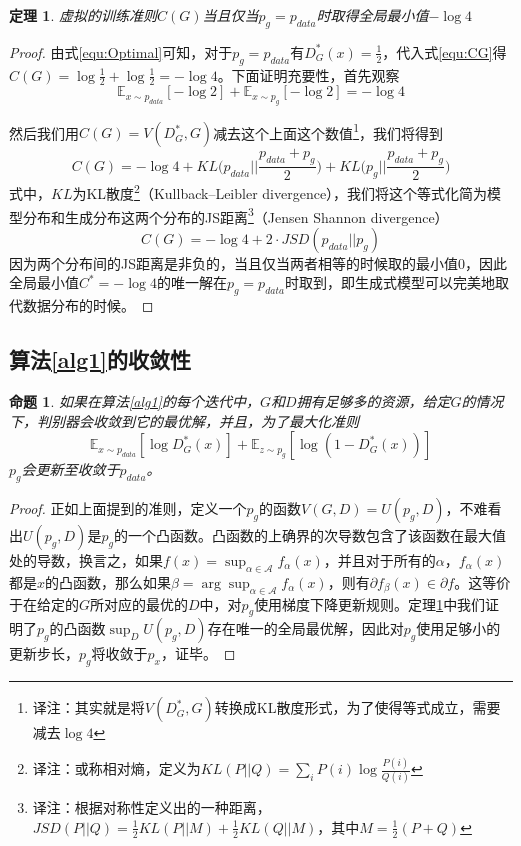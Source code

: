 \documentclass[UTF8]{ctexart}
\newtheorem{proposition}{命题}[section]
\newtheorem{proof}{证明}[section]
\newtheorem{theorem}{定理}[section]
\begin{document}
\begin{theorem}\label{the:1}
虚拟的训练准则$C(G)$当且仅当$p_g = p_{data}$时取得全局最小值$-\log 4$
\end{theorem}
\begin{proof}
由式\eqref{equ:Optimal}可知，对于$p_g = p_{data}$有$D_G^*(x) = \frac{1}{2}$，代入式\eqref{equ:CG}得$C(G) = \log \frac{1}{2} + \log	\frac{1}{2} = -\log 4$。下面证明充要性，首先观察
\begin{equation*}
\mathbb{E}_{x\sim p_{data}}[-\log 2] + \mathbb{E}_{x\sim p_g}[-\log 2] = -\log 4
\end{equation*}

然后我们用$C(G)=V(D^*_G, G)$减去这个上面这个数值\footnote{译注：其实就是将$V(D^*_G, G)$转换成KL散度形式，为了使得等式成立，需要减去$\log 4$}，我们将得到
\begin{equation}
C(G) = -\log 4 + KL\Big(p_{data} \Big|\Big| \frac{p_{data} + p_g}{2} \Big) + KL\Big(p_g \Big|\Big| \frac{p_{data} + p_g}{2}\Big)
\end{equation}
式中，$KL$为KL散度\footnote{译注：或称相对熵，定义为$KL(P||Q) = \sum\limits_i P(i)\log\frac{P(i)}{Q(i)}$}（Kullback–Leibler divergence），我们将这个等式化简为模型分布和生成分布这两个分布的JS距离\footnote{译注：根据对称性定义出的一种距离，$JSD(P || Q) = \frac{1}{2}KL(P || M) + \frac{1}{2}KL(Q || M)$，其中$M = \frac{1}{2}(P+Q)$}（Jensen Shannon divergence）
\begin{equation}
C(G) = -\log 4 + 2 \cdot JSD(p_{data} || p_g)
\end{equation}
因为两个分布间的JS距离是非负的，当且仅当两者相等的时候取的最小值0，因此全局最小值$C^*=-\log 4$的唯一解在$p_g = p_{data}$时取到，即生成式模型可以完美地取代数据分布的时候。
\end{proof}

\subsection{算法\ref{alg1}的收敛性\label{sec:4.2}}

\begin{proposition}
如果在算法\ref{alg1}的每个迭代中，$G$和$D$拥有足够多的资源，给定$G$的情况下，判别器会收敛到它的最优解，并且，为了最大化准则
\begin{equation*}
\mathbb{E}_{x\sim p_{data}}[\log D_G^*(x)] + \mathbb{E}_{z\sim p_g}[\log(1 - D_G^*(x))]
\end{equation*}
$p_g$会更新至收敛于$p_{data}$。
\end{proposition}
\begin{proof}
正如上面提到的准则，定义一个$p_g$的函数$V(G, D) = U(p_g, D)$，不难看出$U(p_g, D)$是$p_g$的一个凸函数。凸函数的上确界的次导数包含了该函数在最大值处的导数，换言之，如果$f(x) = \sup_{\alpha\in \mathcal{A}}f_\alpha(x)$，并且对于所有的$\alpha$，$f_\alpha(x)$都是$x$的凸函数，那么如果$\beta = \arg\sup_{\alpha\in\mathcal{A}}f_\alpha(x)$，则有$\partial f_\beta(x) \in \partial f$。这等价于在给定的$G$所对应的最优的$D$中，对$p_g$使用梯度下降更新规则。定理\ref{the:1}中我们证明了$p_g$的凸函数$\sup_DU(p_g, D)$存在唯一的全局最优解，因此对$p_g$使用足够小的更新步长，$p_g$将收敛于$p_x$，证毕。
\end{proof}
\end{document}

